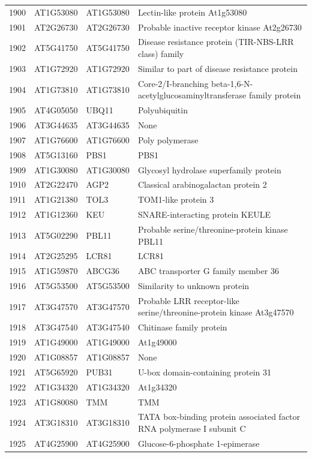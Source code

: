 \documentclass[11pt]{article}
\begin{document}
\begin{center}
\begin{tabular}{rlll}
1900 & AT1G53080 & AT1G53080 & Lectin-like protein At1g53080\\
1901 & AT2G26730 & AT2G26730 & Probable inactive receptor kinase At2g26730\\
1902 & AT5G41750 & AT5G41750 & Disease resistance protein (TIR-NBS-LRR class) family\\
1903 & AT1G72920 & AT1G72920 & Similar to part of disease resistance protein\\
1904 & AT1G73810 & AT1G73810 & Core-2/I-branching beta-1,6-N-acetylglucosaminyltransferase family protein\\
1905 & AT4G05050 & UBQ11 & Polyubiquitin\\
1906 & AT3G44635 & AT3G44635 & None\\
1907 & AT1G76600 & AT1G76600 & Poly polymerase\\
1908 & AT5G13160 & PBS1 & PBS1\\
1909 & AT1G30080 & AT1G30080 & Glycosyl hydrolase superfamily protein\\
1910 & AT2G22470 & AGP2 & Classical arabinogalactan protein 2\\
1911 & AT1G21380 & TOL3 & TOM1-like protein 3\\
1912 & AT1G12360 & KEU & SNARE-interacting protein KEULE\\
1913 & AT5G02290 & PBL11 & Probable serine/threonine-protein kinase PBL11\\
1914 & AT2G25295 & LCR81 & LCR81\\
1915 & AT1G59870 & ABCG36 & ABC transporter G family member 36\\
1916 & AT5G53500 & AT5G53500 & Similarity to unknown protein\\
1917 & AT3G47570 & AT3G47570 & Probable LRR receptor-like serine/threonine-protein kinase At3g47570\\
1918 & AT3G47540 & AT3G47540 & Chitinase family protein\\
1919 & AT1G49000 & AT1G49000 & At1g49000\\
1920 & AT1G08857 & AT1G08857 & None\\
1921 & AT5G65920 & PUB31 & U-box domain-containing protein 31\\
1922 & AT1G34320 & AT1G34320 & At1g34320\\
1923 & AT1G80080 & TMM & TMM\\
1924 & AT3G18310 & AT3G18310 & TATA box-binding protein associated factor RNA polymerase I subunit C\\
1925 & AT4G25900 & AT4G25900 & Glucose-6-phosphate 1-epimerase\\

\end{tabular}
\end{center}
\end{document}
